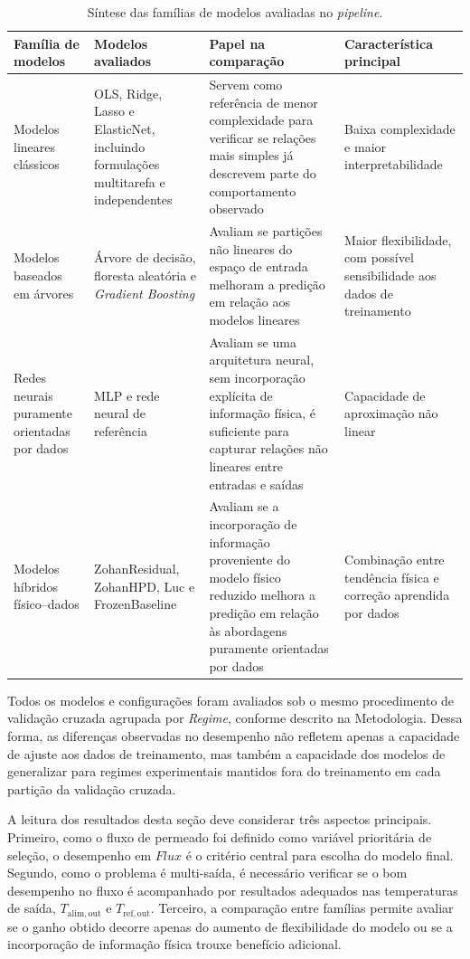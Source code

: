 \begin{table}[H]
\centering
\caption{Síntese das famílias de modelos avaliadas no \textit{pipeline}.}
\label{tab:familias_modelos_avaliados}
\small
\begin{tabular}{p{}p{}p{}p{}}
\toprule
Família de modelos & Modelos avaliados & Papel na comparação & Característica principal \\
\midrule
Modelos lineares clássicos & OLS, Ridge, Lasso e ElasticNet, incluindo formulações multitarefa e independentes & Servem como referência de menor complexidade para verificar se relações mais simples já descrevem parte do comportamento observado & Baixa complexidade e maior interpretabilidade \\
\midrule
Modelos baseados em árvores & Árvore de decisão, floresta aleatória e \textit{Gradient Boosting} & Avaliam se partições não lineares do espaço de entrada melhoram a predição em relação aos modelos lineares & Maior flexibilidade, com possível sensibilidade aos dados de treinamento \\
\midrule
Redes neurais puramente orientadas por dados & MLP e rede neural de referência & Avaliam se uma arquitetura neural, sem incorporação explícita de informação física, é suficiente para capturar relações não lineares entre entradas e saídas & Capacidade de aproximação não linear \\
\midrule
Modelos híbridos físico--dados & ZohanResidual, ZohanHPD, Luc e FrozenBaseline & Avaliam se a incorporação de informação proveniente do modelo físico reduzido melhora a predição em relação às abordagens puramente orientadas por dados & Combinação entre tendência física e correção aprendida por dados \\
\bottomrule
\end{tabular}
\end{table}

Todos os modelos e configurações foram avaliados sob o mesmo procedimento de validação cruzada agrupada por \textit{Regime}, conforme descrito na Metodologia. Dessa forma, as diferenças observadas no desempenho não refletem apenas a capacidade de ajuste aos dados de treinamento, mas também a capacidade dos modelos de generalizar para regimes experimentais mantidos fora do treinamento em cada partição da validação cruzada.

A leitura dos resultados desta seção deve considerar três aspectos principais. Primeiro, como o fluxo de permeado foi definido como variável prioritária de seleção, o desempenho em $Flux$ é o critério central para escolha do modelo final. Segundo, como o problema é multi-saída, é necessário verificar se o bom desempenho no fluxo é acompanhado por resultados adequados nas temperaturas de saída, $T_{\mathrm{alim,out}}$ e $T_{\mathrm{ref,out}}$. Terceiro, a comparação entre famílias permite avaliar se o ganho obtido decorre apenas do aumento de flexibilidade do modelo ou se a incorporação de informação física trouxe benefício adicional.

